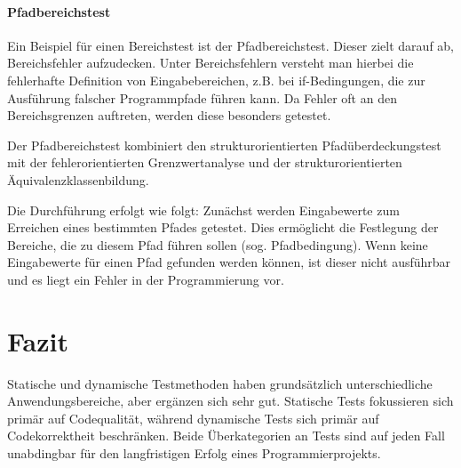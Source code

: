 \documentclass[	%
		fontsize=11pt,  %
		a4paper,	    %
		ngerman,		%
		sans,			%
		f4,				%
	]{HsH-report}		%
\begin{document}
\newpage

\subsubsection{Pfadbereichstest}
Ein Beispiel für einen Bereichstest ist der Pfadbereichstest. Dieser zielt
darauf ab, Bereichsfehler aufzudecken. Unter Bereichsfehlern versteht man
hierbei die fehlerhafte Definition von Eingabebereichen, z.B. bei
if-Bedingungen, die zur Ausführung falscher Programmpfade führen kann. Da
Fehler oft an den Bereichsgrenzen auftreten, werden diese besonders getestet.
\cite{liggesmeyer:qualitaet}

Der Pfadbereichstest kombiniert den strukturorientierten Pfadüberdeckungstest
mit der fehlerorientierten Grenzwertanalyse und der strukturorientierten
Äquivalenzklassenbildung. \cite{liggesmeyer:qualitaet}

Die Durchführung erfolgt wie folgt: Zunächst werden Eingabewerte zum Erreichen
eines bestimmten Pfades getestet. Dies ermöglicht die Festlegung der Bereiche,
die zu diesem Pfad führen sollen (sog. Pfadbedingung). Wenn keine Eingabewerte
für einen Pfad gefunden werden können, ist dieser nicht ausführbar und es liegt
ein Fehler in der Programmierung vor. \cite{liggesmeyer:qualitaet}

\chapter{Fazit}

Statische und dynamische Testmethoden haben grundsätzlich unterschiedliche
Anwendungsbereiche, aber ergänzen sich sehr gut. Statische Tests fokussieren
sich primär auf Codequalität, während dynamische Tests sich primär auf
Codekorrektheit beschränken. Beide Überkategorien an Tests sind auf jeden Fall
unabdingbar für den langfristigen Erfolg eines Programmierprojekts.

\printbibliography
\end{document}
